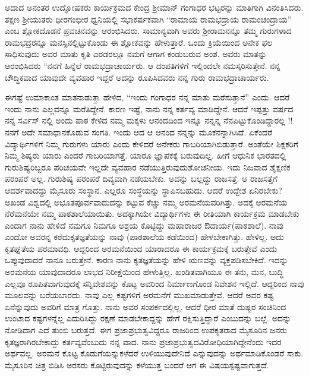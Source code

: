{ಅದಾದ ಅನಂತರ ಉದ್ಘೋಷಕರು ಕಾರ್ಯಕ್ರಮದ ಕೇಂದ್ರ ಶ್ರೀಮಾನ್ ಗಂಗಾಧರ ಭಟ್ಟರನ್ನು ಮಾತಿಗಾಗಿ ವಿನಂತಿಸಿದರು. ತಕ್ಷಣ ಶ್ರೀಯುತರು ಧೀರ\enginline{-}ಗಂಭೀರ ಧ್ವನಿಯಲ್ಲಿ ಸಭಾಕರ್ಷಕವಾಗಿ “ರಾಮಾಯ ರಾಮಭದ್ರಾಯ ರಾಮಂಚಂದ್ರಾಯ” ಎಂಬ ಶ್ಲೋಕದೊಡನೆ ಪ್ರವಚನವನ್ನು ಆರಂಭಿಸಿದರು. ಸಾಮಾನ್ಯವಾಗಿ ಅವರು ಶ್ರೀರಾಮ\-ನನ್ನೂ ತಮ್ಮ ಗುರುಗಳಾದ ರಾಮಭದ್ರರನ್ನೂ ಮನಸ್ಸಿನಲ್ಲಿಟ್ಟುಕೊಂಡು ಈ ಶ್ಲೋಕವನ್ನು ಹೇಳುತ್ತಾರೆ. ಒಂದು ಕ್ರಿಯೆಯಿಂದ ಅನೇಕ ಫಲ ಸಾಧಿಸುವುದು ಅವರ ಮಾತು ಕೃತಿ ಎರಡರಲ್ಲೂ ನಮಗೆ ಆಗಾಗ ಕಂಡುಬರುವ ಅಂಶ. ಅವರು ಮಾತನ್ನು ಆರಂಭಿಸಿದರು \enginline{-} “ನನಗೆ ಹಿನ್ನೆಲೆ ರಾಮಭದ್ರಾಚಾರ್ಯರು. ಆ ದಂಪತಿಗಳಿಗೆ ಇಲ್ಲಿಂದಲೇ ನಮಸ್ಕರಿಸುತ್ತೇನೆ. ನನ್ನ ಬೌದ್ಧಿಕವಾದ ಯಾವುದೇ ವ್ಯವಹಾರ ಇದ್ದರೆ ಅದನ್ನು ರೂಪಿಸಿದವರು ನನ್ನ ಗುರು ರಾಮಭದ್ರಾಚಾರ್ಯರು. 

ಈಗಷ್ಟೆ ಉಮಾಕಾಂತ ಮಾತನಾಡುತ್ತಾ ಹೇಳಿದ, “ಇಂದು ಗಂಗಾಧರ ನನ್ನ ಮಾತು ಮರೆಸುತ್ತಾನೆ” ಎಂದು. ಆದರೆ ಇಂದು ನಾನು ಎಲ್ಲವನ್ನೂ ಮರೆತಿದ್ದೇನೆ. ಕಾರಣ ಇಷ್ಟೆ, ನಾನು ನನ್ನ ಕರ್ತವ್ಯ ಮಾಡಿದ್ದೇನೆ. ಆದರೆ ಇಪ್ಪತ್ತು ವರ್ಷದ ನನ್ನ ಸರ್ವಿಸ್ ನಲ್ಲಿ ಅಂದು ಪಾಠ ಕೇಳಿದ ನಮ್ಮ ಮಕ್ಕಳು ಆನಂದದಿಂದ ಇನ್ನೂ ನನ್ನನ್ನ ನೆನಪಿಟ್ಟುಕೊಂಡಿದ್ದಾರಲ್ಲ !! ನನಗೆ ಅದೇ ಸಮಾಧಾನಕೊಡುವ ಸಂಗತಿ. ಇಂದು ಆದ ಆ ಆನಂದ ನನ್ನನ್ನು ಮೂಕನನ್ನಾಗಿಸಿದೆ. ಏಕೆಂದರೆ ವಿದ್ಯಾರ್ಥಿಗಳಿಗೆ ನಿಮ್ಮ ಗುರುಗಳು ಯಾರು ಎಂದು ಕೇಳಿದರೆ ಅನೇಕರು ಗಾಬರಿಯಾಗಿಬಿಡುತ್ತಾರೆ. ಅಂತೆಯೇ ಶಿಕ್ಷಕರಿಗೆ ನಿಮ್ಮ ಶಿಷ್ಯರು ಯಾರು ಎಂದರೆ ಗಾಬರಿಯಾಗತ್ತೆ. ಯಾರೂ ಜ್ಞಾಪಕಕ್ಕೆ ಬರುವುದಿಲ್ಲ. ಹೀಗೆ ಆಧುನಿಕ ಭಾರತ\-ದಲ್ಲಿ ಗುರುಶಿಷ್ಯರಿಬ್ಬರೂ ಪರಿಚಯವೇ ಇಲ್ಲದೇ ವ್ಯವಹಾರ ನಡೆಯುತ್ತಿರುವುದು\break ಶೋಚನೀಯ. ಇದು ನಿಜವಾದ ಶೈಕ್ಷಣಿಕ ಪರಂಪರೆ ಅಲ್ಲ. ಗುರುಶಿಷ್ಯ ಪರಂಪರೆ ದಿವ್ಯ\-ವಾಗಿ ನಡೆಯಬೇಕು. ಅದನ್ನು ಬಲ್ಲದ್ದು ರಾಜಸತ್ತೆ. ಆ ರಾಜಸತ್ತೆಗೆ ಆದರ್ಶ\-ವಾದದ್ದು ಮೈಸೂರು ಸಂಸ್ಥಾನ. ಎಲ್ಲರೂ ಸಂಸ್ಥೆಯನ್ನು ಸ್ಥಾಪಿಸಬಹುದು. ಆದರೆ ಉದ್ದೇಶ ಏನಿರ\-ಬೇಕು? ಅಖಂಡ ವಿಶ್ವದಲ್ಲಿ ಅಭೂತಪೂರ್ವವಾದುದನ್ನು ಕಟ್ಟುವ ಕೆಚ್ಚು ನಮ್ಮ ಅರಮನೆ\-ಯವರಿಗಿತ್ತು. ಅದಕ್ಕೆ  ಅರಮನೆಯ ನೆರೆಮನೆಯೇ ನಮ್ಮ ಪಾಠಶಾಲೆ\-ಯಾಯಿತು. ಅದಕ್ಕಾಗಿಯೇ ವಿದ್ಯಾರ್ಥಿಗಳು ಈ ರೀತಿಯಾಗಿ ಕಾರ್ಯಕ್ರಮ ಮಾಡಬೇಕು ಎಂದಾಗ ನಾನು ಹೇಳಿದೆ \enginline{-} ನಮಗೂ ನಿಮಗೂ ಆಶ್ರಯ ಕೊಟ್ಟಿದ್ದು ಮಹಾರಾಜರ ಔದಾರ್ಯ(ಪಾಠಶಾಲೆ). ನಾವು ಎಂದೋ ಅವರನ್ನ ಕರೆದು\break ಕೃತಜ್ಞತೆಯನ್ನು ನಾವು (ಪಾಠಶಾಲೆಯ ಕಡೆಯಿಂದ)  ಹೇಳಬೇಕಾಗಿತ್ತು. ಹೇಳಿಲ್ಲ. ಅದು ಕೃತಘ್ನತೆಯ ಪರಮಾವಧಿ. ಆದ್ದರಿಂದ ಅರಮನೆಯಿಂದ ಯಾರಾದರೂ ಈ ಕಾರ್ಯಕ್ರಮಕ್ಕೆ ಬರುತ್ತೇವೆ ಎಂದು ಒಪ್ಪುವುದಾದರೆ ನಾನೂ ಬರುತ್ತೇನೆ. ಕಾರಣ ನಾನು ಕೃತಜ್ಞತೆಯನ್ನು ಹೇಳಿ ಋಣವನ್ನು ವ್ಯಕ್ತಪಡಿಸಬೇಕಿದೆ. ಇದನ್ನು \hbox{ಅರಮನೆಯ} ಯಾವುದಾದರೂ ಲಾಭದ ನಿರೀಕ್ಷೆಯಿಂದ ಹೇಳುತ್ತಿಲ್ಲ. ಖಂಡಿತವಾಗಿಯೂ ಈ ತನು, ಮನ, ಬುದ್ಧಿ ಎಲ್ಲವೂ ರೂಪಿತವಾಗುವುದಕ್ಕೆ ಸನ್ನಿವೇಶವನ್ನು ಕೊಟ್ಟ ಅವರಿಂದ ನಿರ್ಮಾಣಗೊಂಡ ನಿವೇಶನ ಇಲ್ಲಿದೆ. ಆದ್ದರಿಂದ ನಾವು ಮೂಲವನ್ನು ಬರೆಯ\-ಬಾರದು. ನಾವು ಎಲ್ಲ ಕಷ್ಟಗಳಿಗೆ ಅರಮನೆಗೆ ಮುಖಮಾಡುತ್ತೇವೆ. ಆದರೆ ಅವರ ಕಷ್ಟ ಏನೆನ್ನುವುದು ಅವರಿಗೆ ಮಾತ್ರ ಗೊತ್ತು. ನಾನು ಅವರ ಸಂಪರ್ಕದಲ್ಲಿಲ್ಲ. ಆದರೆ ಧೀರ ಮಾತೆ ದುಷ್ಟರ ಸಂಚಿನಿಂದ ಉಂಟಾದ ಕಷ್ಟಗಳನ್ನೆಲ್ಲ ಎದುರಿಸಿದ್ದು  ರಕ್ಷಣೆ ಮಾಡಬೇಕಾದ್ದನ್ನು ಹೇಗೆ ರಕ್ಷಿಸುತ್ತಿದ್ದಾರೆ ಎಂಬುದನ್ನು ಬಲ್ಲೆ. ಅದನ್ನು ನೋಡಿದಾಗ ಎದೆ ತುಂಬಿ ಬರುತ್ತದೆ. ಈಗ ಪ್ರಜಾಪ್ರಭುತ್ವವಿದ್ದರೂ ರಾಜರಿಂದ ಉಪಕೃತರಾದ  ಮೈಸೂರಿನ ಜನರು ಕೃತಜ್ಞರಾಗಿರಬೇಕಾದ್ದು ಕರ್ತವ್ಯವೆಂಬುದು ನನ್ನ ವಾದ. ನಾನು ಪ್ರಜಾಪ್ರಭುತ್ವದ\break ವಿರೋಧಿಯಾಗಿದ್ದೇನೆಂದು  ಇದರ ಅರ್ಥವಲ್ಲ. ಅರಮನೆ ಕೊಟ್ಟ ಕೊಡುಗೆಯನ್ನು\break ಕಳೆದರೆ ಉಳಿಯುವುದೇನಿದೆ ಎನ್ನುವುದನ್ನು  ಅರ್ಥಮಾಡಿಕೊಂಡರೆ ಸಾಕು. ಮೈಸೂರಿನ ಚಿತ್ರ ಬಿಡಿಸಿ ಅರಸರು ಕೊಟ್ಟಿರುವುದನ್ನು ಕಳೆಯುತ್ತ ಬಂದರೆ ಆಗ ಈ ವಿಷಯ\break ಸ್ಪಷ್ಟ\-ವಾಗುತ್ತದೆ. 

}

